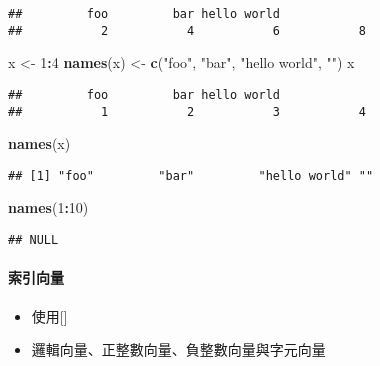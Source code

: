 \documentclass[
]{article}
\newenvironment{Shaded}{\begin{snugshade}}{\end{snugshade}}
\newcommand{\DecValTok}[1]{\textcolor[rgb]{0.00,0.00,0.81}{#1}}
\newcommand{\KeywordTok}[1]{\textcolor[rgb]{0.13,0.29,0.53}{\textbf{#1}}}
\newcommand{\NormalTok}[1]{#1}
\newcommand{\OperatorTok}[1]{\textcolor[rgb]{0.81,0.36,0.00}{\textbf{#1}}}
\newcommand{\StringTok}[1]{\textcolor[rgb]{0.31,0.60,0.02}{#1}}
\providecommand{\tightlist}{%
  \setlength{\itemsep}{0pt}\setlength{\parskip}{0pt}}
\begin{document}
\begin{verbatim}
##         foo         bar hello world             
##           2           4           6           8
\end{verbatim}

\begin{Shaded}
\begin{Highlighting}[]
\NormalTok{x <-}\StringTok{ }\DecValTok{1}\OperatorTok{:}\DecValTok{4}
\KeywordTok{names}\NormalTok{(x) <-}\StringTok{ }\KeywordTok{c}\NormalTok{(}\StringTok{"foo"}\NormalTok{, }\StringTok{"bar"}\NormalTok{, }\StringTok{"hello world"}\NormalTok{, }\StringTok{""}\NormalTok{)}
\NormalTok{x}
\end{Highlighting}
\end{Shaded}

\begin{verbatim}
##         foo         bar hello world             
##           1           2           3           4
\end{verbatim}

\begin{Shaded}
\begin{Highlighting}[]
\KeywordTok{names}\NormalTok{(x)}
\end{Highlighting}
\end{Shaded}

\begin{verbatim}
## [1] "foo"         "bar"         "hello world" ""
\end{verbatim}

\begin{Shaded}
\begin{Highlighting}[]
\KeywordTok{names}\NormalTok{(}\DecValTok{1}\OperatorTok{:}\DecValTok{10}\NormalTok{)}
\end{Highlighting}
\end{Shaded}

\begin{verbatim}
## NULL
\end{verbatim}

\hypertarget{ux7d22ux5f15ux5411ux91cf}{%
\paragraph{索引向量}\label{ux7d22ux5f15ux5411ux91cf}}

\begin{itemize}
\tightlist
\item
  使用{[}{]}
\item
  邏輯向量、正整數向量、負整數向量與字元向量
\end{itemize}
\end{document}
